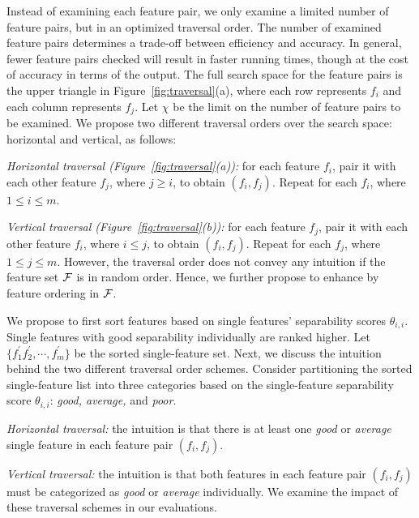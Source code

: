  Instead of examining each feature pair, we only examine a limited number of feature pairs, but in an optimized traversal order. The number of examined feature pairs determines a trade-off between efficiency and accuracy. In general, fewer feature pairs checked will result in faster running times, though at the cost of accuracy in terms of the output.
The full search space for the feature pairs is the upper triangle in Figure~\ref{fig:traversal}(a), where each row represents $f_i$ and each column represents $f_j$. Let $\chi$ be the limit on the number of feature pairs to be examined. We propose two different traversal orders over the search space: horizontal and vertical, as follows:
\squishlist
\item \emph{Horizontal traversal (Figure~\ref{fig:traversal}(a)):} for each feature $f_i$, pair it with each other feature $f_j$, where $j\geq i$, to obtain $(f_i,f_j)$. Repeat for each $f_i$, where $1 \leq i\leq m$.
\item \emph{Vertical traversal (Figure~\ref{fig:traversal}(b)):} for each feature $f_j$, pair it with each other feature $f_i$, where $i\leq j$, to obtain $(f_i,f_j)$. Repeat for each $f_j$, where $1 \leq j\leq m$.
\squishend
\noindent
However, the traversal order does not convey any intuition if the feature set ${\mathcal{F}}$ is in random order. Hence, we further propose to enhance \traversal by feature ordering in ${\mathcal{F}}$.

 We propose to first sort features based on single features' separability scores $\theta_{i,i}$. Single features with good separability individually are ranked higher. Let $\{f_1^{'} f_2^{'},\cdots,f_m^{'}\}$ be the sorted single-feature set. Next, we discuss the intuition behind the two different traversal order schemes. Consider partitioning the sorted single-feature list into three categories based on the single-feature separability score $\theta_{i,i}$: {\em good, average,} and {\em poor}.
\squishlist
\item \emph{Horizontal traversal:} the intuition is that there is at least one {\em good} or {\em average} single feature in each \topk feature pair $(f_i,f_j)$.
\item \emph{Vertical traversal:} the intuition is that both features in each \topk feature pair $(f_i,f_j)$ must be categorized as {\em good} or {\em average} individually.
\squishend
\noindent We examine the impact of these traversal schemes in our evaluations.

